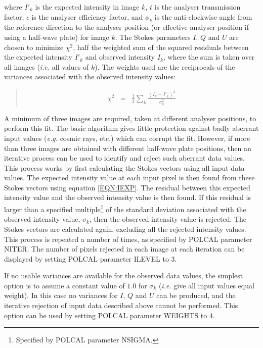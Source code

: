 \documentclass[twoside,11pt]{article}
\renewcommand{\_}{\texttt{\symbol{95}}}
\newenvironment{myquote}{\begin{quote}\begin{small}}{\end{small}\end{quote}}
\begin{document}
where $I'_{k}$ is the expected intensity in image $k$, $t$ is the analyser
transmission factor, $\epsilon$ is the analyser efficiency factor, and
$\phi_{k}$ is the anti-clockwise angle from the reference direction to the
analyser position (or effective analyser position if using a half-wave
plate) for image $k$. The Stokes parameters $I$, $Q$ and $U$ are chosen
to minimize $\chi^2$, half the weighted sum of the squared residuals between 
the expected intensity $I'_{k}$ and observed intensity $I_{k}$, where the sum is taken over all images
(\emph{i.e.} all values of $k$). The weights used are the reciprocals of
the variances associated with the observed intensity values:

\begin{myquote}
\begin{eqnarray*}
  \label{EQN:CHI}
  \chi^2 & = & \frac{1}{2}\sum_{k} \frac{(I_{k}-I'_{k})^2}{\sigma^2_{k}}
\end{eqnarray*}
\end{myquote}

A minimum of three images are required, taken at different analyser
positions, to perform this fit. The basic algorithm gives little
protection against badly aberrant input values (\emph{e.g.} cosmic rays,
etc.) which can corrupt the fit. However, if more than three images are
obtained with different half-wave plate positions, then an iterative
process can be used to identify and reject such aberrant data values.
This process works by first calculating the Stokes vectors using all
input data values. The expected intensity value at each input pixel is
then found from these Stokes vectors using equation \ref{EQN:IEXP}. The
residual between this expected intensity value and the observed intensity
value is then found. If this residual is larger than a specified
multiple\footnote{Specified by POLCAL parameter NSIGMA.} of the standard
deviation associated with the observed intensity value, $\sigma_k$, then
the observed intensity value is rejected. The Stokes vectors are
calculated again, excluding all the rejected intensity values. This
process is repeated a number of times, as specified by POLCAL parameter
NITER. The number of pixels rejected in each image at each iteration can
be displayed by setting POLCAL parameter ILEVEL to 3.

If no usable variances are available for the observed data values, the
simplest option is to assume a constant value of $1.0$ for $\sigma_{k}$ 
(\emph{i.e.} give all input values equal weight). In this case no
variances for $I$, $Q$ and $U$ can be produced, and the iterative rejection
of input data described above cannot be performed. This option can be
used by setting POLCAL parameter WEIGHTS to 4.
\end{document}
